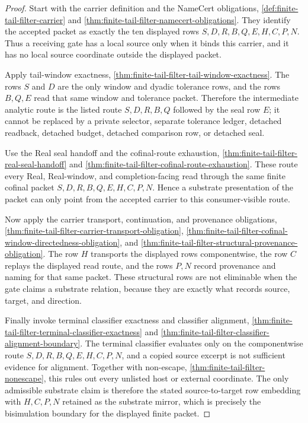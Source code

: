\begin{proof}
Start with the carrier definition and the NameCert obligations, \autoref{def:finite-tail-filter-carrier} and \autoref{thm:finite-tail-filter-namecert-obligations}. They identify the accepted packet as exactly the ten displayed rows $S,D,R,B,Q,E,H,C,P,N$. Thus a receiving gate has a local source only when it binds this carrier, and it has no local source coordinate outside the displayed packet.

Apply tail-window exactness, \autoref{thm:finite-tail-filter-tail-window-exactness}. The rows $S$ and $D$ are the only window and dyadic tolerance rows, and the rows $B,Q,E$ read that same window and tolerance packet. Therefore the intermediate analytic route is the listed route $S,D,R,B,Q$ followed by the seal row $E$; it cannot be replaced by a private selector, separate tolerance ledger, detached readback, detached budget, detached comparison row, or detached seal.

Use the Real seal handoff and the cofinal-route exhaustion, \autoref{thm:finite-tail-filter-real-seal-handoff} and \autoref{thm:finite-tail-filter-cofinal-route-exhaustion}. These route every Real, Real-window, and completion-facing read through the same finite cofinal packet $S,D,R,B,Q,E,H,C,P,N$. Hence a substrate presentation of the packet can only point from the accepted carrier to this consumer-visible route.

Now apply the carrier transport, continuation, and provenance obligations, \autoref{thm:finite-tail-filter-carrier-transport-obligation}, \autoref{thm:finite-tail-filter-cofinal-window-directedness-obligation}, and \autoref{thm:finite-tail-filter-structural-provenance-obligation}. The row $H$ transports the displayed rows componentwise, the row $C$ replays the displayed read route, and the rows $P,N$ record provenance and naming for that same packet. These structural rows are not eliminable when the gate claims a substrate relation, because they are exactly what records source, target, and direction.

Finally invoke terminal classifier exactness and classifier alignment, \autoref{thm:finite-tail-filter-terminal-classifier-exactness} and \autoref{thm:finite-tail-filter-classifier-alignment-boundary}. The terminal classifier evaluates only on the componentwise route $S,D,R,B,Q,E,H,C,P,N$, and a copied source excerpt is not sufficient evidence for alignment. Together with non-escape, \autoref{thm:finite-tail-filter-nonescape}, this rules out every unlisted host or external coordinate. The only admissible substrate claim is therefore the stated source-to-target row embedding with $H,C,P,N$ retained as the substrate mirror, which is precisely the bisimulation boundary for the displayed finite packet.
\end{proof}

